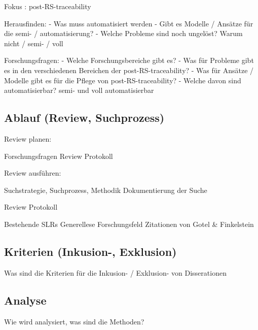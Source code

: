 Fokus : post-RS-traceability

Herausfinden:
- Was muss automatisiert werden
- Gibt es Modelle / Ansätze für die semi- / automatisierung?
- Welche Probleme sind noch ungelöst? Warum nicht / semi- / voll

Forschungsfragen:
- Welche Forschungsbereiche gibt es?
- Was für Probleme gibt es in den verschiedenen Bereichen der post-RS-traceability?
- Was für Ansätze / Modelle gibt es für die Pflege von post-RS-traceability?
- Welche davon sind automatisierbar? semi- und voll automatisierbar

\subsection{Ablauf (Review, Suchprozess)}

Review planen:

Forschungsfragen
Review Protokoll

Review ausführen:

Suchstrategie, Suchprozess, Methodik
Dokumentierung der Suche

Review Protokoll

Bestehende SLRs
Generellese Forschungsfeld
Zitationen von Gotel \& Finkelstein

\subsection{Kriterien (Inkusion-, Exklusion)}

Was sind die Kriterien für die Inkusion- / Exklusion- von Disserationen

\subsection{Analyse}

Wie wird analysiert, was sind die Methoden?



